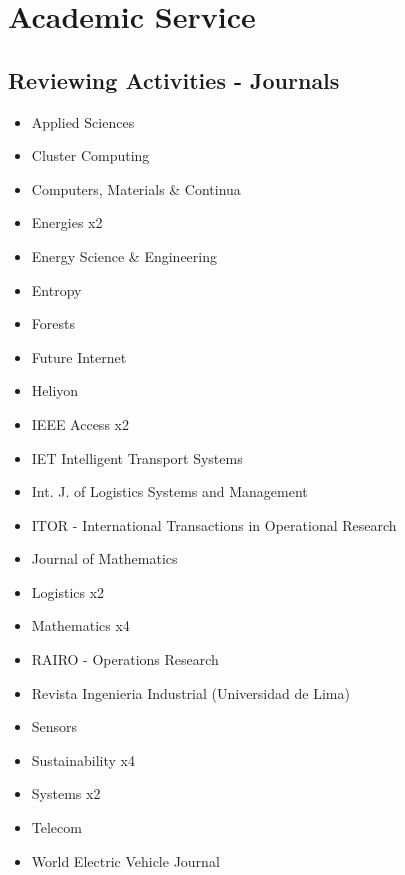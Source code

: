 \section{Academic Service}

\subsection{Reviewing Activities - Journals}

{\begin{itemize}
\item Applied Sciences
\item Cluster Computing
\item Computers, Materials \& Continua
\item Energies x2
\item Energy Science \& Engineering
\item Entropy
\item Forests
\item Future Internet
\item Heliyon
\item IEEE Access x2
\item IET Intelligent Transport Systems
\item Int. J. of Logistics Systems and Management
\item ITOR - International Transactions in Operational Research
\item Journal of Mathematics
\item Logistics x2
\item Mathematics x4
\item RAIRO - Operations Research
\item Revista Ingenieria Industrial (Universidad de Lima)
\item Sensors
\item Sustainability x4
\item Systems x2
\item Telecom
\item World Electric Vehicle Journal
\end{itemize}
}

